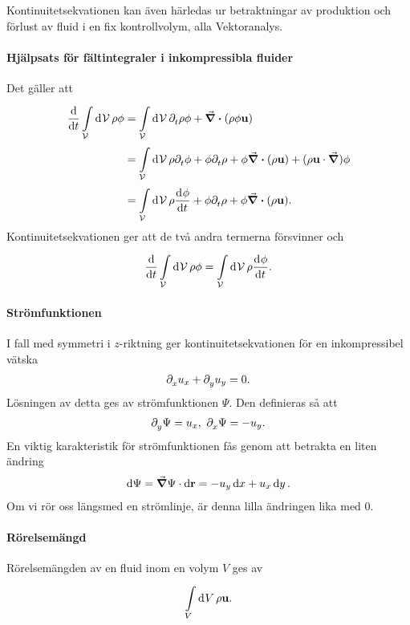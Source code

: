 Kontinuitetsekvationen kan även härledas ur betraktningar av produktion och förlust av fluid i en fix kontrollvolym, alla Vektoranalys.

\paragraph{Hjälpsats för fältintegraler i inkompressibla fluider}
Det gäller att
\begin{align*}
	\dv{t}\int\limits_{\mathcal{V}}^{}\dd[]{\mathcal{V}}\rho\phi &= \int\limits_{\mathcal{V}}^{}\dd[]{\mathcal{V}}\partial_{t}^{}\rho\phi + \div(\rho\phi\vb{u}) \\
	                                               &= \int\limits_{\mathcal{V}}^{}\dd[]{\mathcal{V}}\rho\partial_{t}^{}\phi + \phi\partial_{t}^{}\rho + \phi\div(\rho\vb{u}) + (\rho\vb{u}\cdot\grad)\phi \\
	                                               &= \int\limits_{\mathcal{V}}^{}\dd[]{\mathcal{V}}\rho\dv[]{\phi}{t} + \phi\partial_{t}^{}\rho + \phi\div(\rho\vb{u}).
\end{align*}
Kontinuitetsekvationen ger att de två andra termerna försvinner och
\begin{align*}
	\dv{t}\int\limits_{\mathcal{V}}^{}\dd[]{\mathcal{V}}\rho\phi =\int\limits_{\mathcal{V}}^{}\dd[]{\mathcal{V}}\rho\dv[]{\phi}{t}.
\end{align*}

\paragraph{Strömfunktionen}
I fall med symmetri i $z$-riktning ger kontinuitetsekvationen för en inkompressibel vätska
\begin{align*}
	\partial_{x}^{}u_{x} + \partial_{y}^{}u_{y} = 0.
\end{align*}
Lösningen av detta ges av strömfunktionen $\Psi$. Den definieras så att
\begin{align*}
	\partial_{y}^{}\Psi = u_{x},\ \partial_{x}^{}\Psi = -u_{y}.
\end{align*}
En viktig karakteristik för strömfunktionen fås genom att betrakta en liten ändring
\begin{align*}
	\dd{\Psi} = \grad{\Psi}\cdot\dd{\vb{r}} = -u_{y}\dd{x} + u_{x}\dd{y}.
\end{align*}
Om vi rör oss längsmed en strömlinje, är denna lilla ändringen lika med $0$.

\paragraph{Rörelsemängd}
Rörelsemängden av en fluid inom en volym $V$ ges av
\begin{align*}
	\int\limits_{V}^{}\dd[]{V}\rho\vb{u}.
\end{align*}

